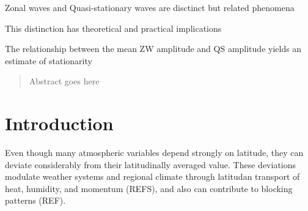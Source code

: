 \documentclass[draft,linenumbers]{agujournal2018}
\begin{document}



\begin{keypoints}
\item Zonal waves and Quasi-stationary waves are disctinct but related
phenomena
\item This distinction has theoretical and practical implications
\item The relationship between the mean ZW amplitude and QS amplitude yields
an estimate of stationarity
\end{keypoints}

%
%


\begin{abstract}
Abstract goes here
\end{abstract}

\section{Introduction}

Even though many atmospheric variables depend strongly on latitude, they
can deviate considerably from their latitudinally averaged value. These
deviations modulate weather systems and regional climate through
latitudan transport of heat, humidity, and momentum (REFS), and also can
contribute to blocking patterns (REF).
\end{document}
